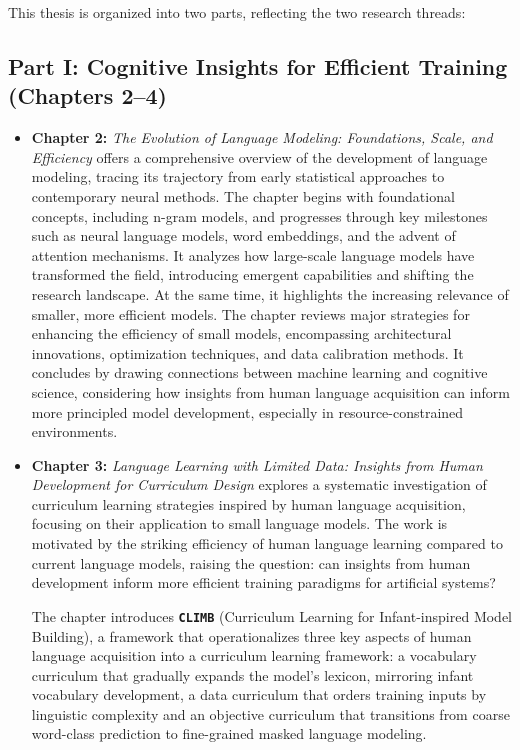 This thesis is organized into two parts, reflecting the two research threads:

\subsection*{Part I: Cognitive Insights for Efficient Training (Chapters 2–4)}

\begin{itemize}

    \item \textbf{Chapter 2:} \emph{The Evolution of Language Modeling: Foundations, Scale, and Efficiency} offers a comprehensive overview of the development of language modeling, tracing its trajectory from early statistical approaches to contemporary neural methods. The chapter begins with foundational concepts, including n-gram models, and progresses through key milestones such as neural language models, word embeddings, and the advent of attention mechanisms. It analyzes how large-scale language models have transformed the field, introducing emergent capabilities and shifting the research landscape. At the same time, it highlights the increasing relevance of smaller, more efficient models. The chapter reviews major strategies for enhancing the efficiency of small models, encompassing architectural innovations, optimization techniques, and data calibration methods. It concludes by drawing connections between machine learning and cognitive science, considering how insights from human language acquisition can inform more principled model development, especially in resource-constrained environments.


    \item \textbf{Chapter 3:} \emph{Language Learning with Limited Data: Insights from Human Development for Curriculum Design}  
    explores a systematic investigation of curriculum learning strategies inspired by human language acquisition, focusing on their application to small language models. The work is motivated by the striking efficiency of human language learning compared to current language models, raising the question: can insights from human development inform more efficient training paradigms for artificial systems?

    The chapter introduces \textbf{\texttt{CLIMB}} (Curriculum Learning for Infant-inspired Model Building), a framework that operationalizes three key aspects of human language acquisition into a curriculum learning framework: a vocabulary curriculum that gradually expands the model's lexicon, mirroring infant vocabulary development, a data curriculum that orders training inputs by linguistic complexity and an objective curriculum that transitions from coarse word-class prediction to fine-grained masked language modeling.


\end{itemize}

